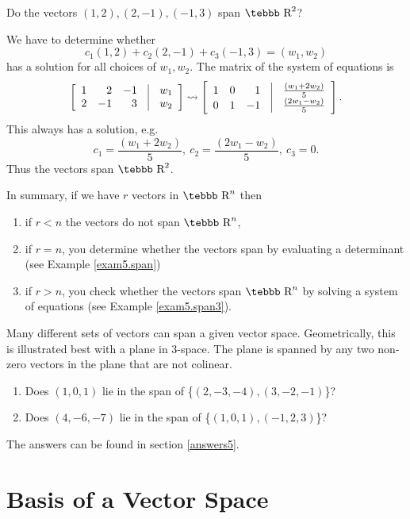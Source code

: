 \begin{example}
\label{exam5.span3}
Do the vectors {$(1,2),(2,-1),(-1,3)$} span $\mbox{\tebbb R}^2$?

We have to determine whether
$$c_1(1,2)+c_2(2,-1)+c_3(-1,3)=(w_1,w_2)$$
has a solution for all choices of $w_1,w_2$.  The matrix of the system of equations is
$$\left [\begin{array}{rrrcr} 1&2&-1&\vline&w_1\\
2&-1&3&\vline&w_2\end{array}\right] \leadsto
\left [\begin{array}{rrrcr} 1&0&1&\vline&\frac{(w_1+2w_2)}{5}\\
0&1&-1&\vline&\frac{(2w_1-w_2)}{5}\end{array}\right].$$
This always has a solution, e.g.
$$c_1=\frac{(w_1+2w_2)}{5},\ c_2=\frac{(2w_1-w_2)}{5},\ c_3=0.$$
Thus the vectors span $\mbox{\tebbb R}^2$.
\end{example}

In summary, if we have $r$ vectors in $\mbox{\tebbb R}^n$ then
\begin{enumerate}
\item  if $r<n$ the vectors do not span $\mbox{\tebbb R}^n$,
\item  if $r=n$, you determine whether the vectors span by evaluating a determinant
(see Example \ref{exam5.span})
\item  if $r>n$, you check whether the vectors span $\mbox{\tebbb R}^n$ by solving
a system of equations (see Example \ref{exam5.span3}).
\end{enumerate}
Many different sets of vectors can span a given vector space.
Geometrically, this is illustrated best with a plane in 3-space.
The plane is spanned by any two non-zero vectors in the plane that are not colinear.


\begin{enumerate}
\item Does $(1,0,1)$ lie in the span of \{$(2,-3,-4),(3,-2,-1)$\}?
\item Does $(4,-6,-7)$ lie in the span of \{$(1,0,1),(-1,2,3)$\}?
\end{enumerate}

\noindent The answers can be found in section \ref{answers5}.

\section{Basis of a Vector Space}
\label{ssec.basis}

